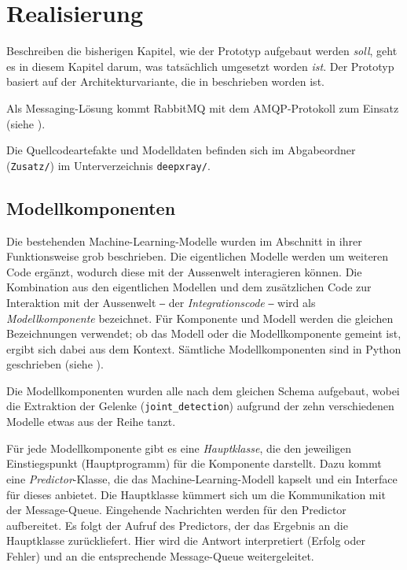 \section{Realisierung}
\label{sec:realisierung}

Beschreiben die bisherigen Kapitel, wie der Prototyp aufgebaut werden \textit{soll}, geht es in diesem Kapitel darum, was tatsächlich umgesetzt worden \textit{ist}. Der Prototyp basiert auf der Architekturvariante, die in  beschrieben worden ist.

Als Messaging-Lösung kommt RabbitMQ mit dem AMQP-Protokoll zum Einsatz (siehe ).

Die Quellcodeartefakte und Modelldaten befinden sich im Abgabeordner (\texttt{Zusatz/}) im Unterverzeichnis \texttt{deepxray/}.

\subsection{Modellkomponenten}

Die bestehenden Machine-Learning-Modelle wurden im Abschnitt  in ihrer Funktionsweise grob beschrieben. Die eigentlichen Modelle werden um weiteren Code ergänzt, wodurch diese mit der Aussenwelt interagieren können. Die Kombination aus den eigentlichen Modellen und dem zusätzlichen Code zur Interaktion mit der Aussenwelt ‒ der \textit{Integrationscode} ‒ wird als \textit{Modellkomponente} bezeichnet. Für Komponente und Modell werden die gleichen Bezeichnungen verwendet; ob das Modell oder die Modellkomponente gemeint ist, ergibt sich dabei aus dem Kontext. Sämtliche Modellkomponenten sind in Python geschrieben (siehe ).

Die Modellkomponenten wurden alle nach dem gleichen Schema aufgebaut, wobei die Extraktion der Gelenke (\texttt{joint\_detection}) aufgrund der zehn verschiedenen Modelle etwas aus der Reihe tanzt.

Für jede Modellkomponente gibt es eine \textit{Hauptklasse}, die den jeweiligen Einstiegspunkt (Hauptprogramm) für die Komponente darstellt. Dazu kommt eine \textit{Predictor}-Klasse, die das Machine-Learning-Modell kapselt und ein Interface für dieses anbietet. Die Hauptklasse kümmert sich um die Kommunikation mit der Message-Queue. Eingehende Nachrichten werden für den Predictor aufbereitet. Es folgt der Aufruf des Predictors, der das Ergebnis an die Hauptklasse zurückliefert. Hier wird die Antwort interpretiert (Erfolg oder Fehler) und an die entsprechende Message-Queue weitergeleitet.

